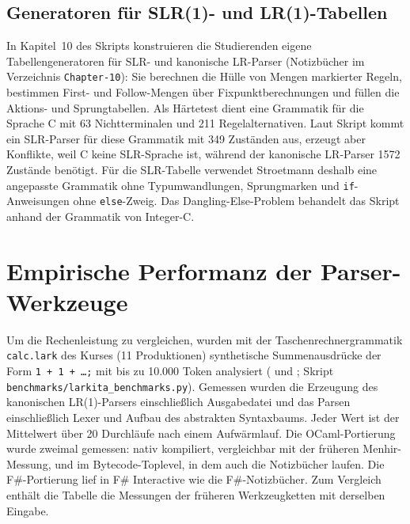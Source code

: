 \subsection{Generatoren für SLR(1)- und LR(1)-Tabellen}
In Kapitel~10 des Skripts konstruieren die Studierenden eigene Tabellengeneratoren für SLR- und kanonische LR-Parser (Notizbücher im Verzeichnis \texttt{Chapter-10}): Sie berechnen die Hülle von Mengen markierter Regeln, bestimmen First- und Follow-Mengen über Fixpunktberechnungen und füllen die Aktions- und Sprungtabellen.
Als Härtetest dient eine Grammatik für die Sprache C mit 63 Nichtterminalen und 211 Regelalternativen.
Laut Skript kommt ein SLR-Parser für diese Grammatik mit 349 Zuständen aus, erzeugt aber Konflikte, weil C keine SLR-Sprache ist, während der kanonische LR-Parser 1572 Zustände benötigt.
Für die SLR-Tabelle verwendet Stroetmann deshalb eine angepasste Grammatik ohne Typumwandlungen, Sprungmarken und \texttt{if}-Anweisungen ohne \texttt{else}-Zweig.
Das Dangling-Else-Problem behandelt das Skript anhand der Grammatik von Integer-C.


\section{Empirische Performanz der Parser-Werkzeuge}
\label{sec:toolchain_empirical}

Um die Rechenleistung zu vergleichen, wurden mit der Taschenrechnergrammatik \texttt{calc.lark} des Kurses (11 Produktionen) synthetische Summenausdrücke der Form \texttt{1 + 1 + \dots;} mit bis zu 10.000 Token analysiert ( und ; Skript \texttt{benchmarks/larkita\_benchmarks.py}).
Gemessen wurden die Erzeugung des kanonischen LR(1)-Parsers einschließlich Ausgabedatei und das Parsen einschließlich Lexer und Aufbau des abstrakten Syntaxbaums.
Jeder Wert ist der Mittelwert über 20 Durchläufe nach einem Aufwärmlauf.
Die OCaml-Portierung wurde zweimal gemessen: nativ kompiliert, vergleichbar mit der früheren Menhir-Messung, und im Bytecode-Toplevel, in dem auch die Notizbücher laufen.
Die F\#-Portierung lief in F\# Interactive wie die F\#-Notizbücher.
Zum Vergleich enthält die Tabelle die Messungen der früheren Werkzeugketten mit derselben Eingabe.

